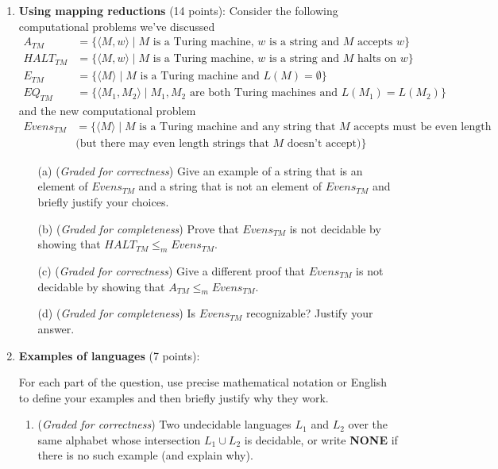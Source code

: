 \documentclass[12pt, oneside]{article}
\newcommand{\gradeCorrect}{({\it Graded for correctness}) }
\newcommand{\gradeComplete}{({\it Graded for completeness}) }
\begin{document}
\begin{enumerate}[wide, labelwidth=!, labelindent=0pt]
\item\textbf{Using mapping reductions} (14 points):
Consider the following computational problems we've discussed
\begin{align*}
A_{TM} &= \{ \langle M, w \rangle \mid M \text{ is a Turing machine, } w \text{ is a string and $M$ accepts $w$}\} \\
HALT_{TM} &= \{ \langle M, w \rangle \mid M \text{ is a Turing machine, } w \text{ is a string and $M$ halts on $w$}\} \\
E_{TM} &=  \{ \langle M \rangle \mid M \text{ is a Turing machine and } L(M) = \emptyset\} \\
EQ_{TM} &= \{ \langle M_1, M_2 \rangle \mid M_1, M_2 \text{ are both Turing machines and } L(M_1) = L(M_2) \}
\end{align*}
and the new computational problem
\begin{align*}
    Evens_{TM} &= \{ \langle M \rangle \mid M \text{ is a Turing machine 
    and any string that $M$ accepts must be even length}\\
    &\text{(but there may even length strings that $M$ doesn't accept)} \}
\end{align*}
\begin{enumerate}
\item[(a)] \gradeCorrect Give an example of a string that is an element of $Evens_{TM}$ and a string that is not an element of
$Evens_{TM}$ and briefly justify your choices.
\item[(b)] \gradeComplete Prove that $Evens_{TM}$ is not decidable by showing that $HALT_{TM} \leq_m Evens_{TM}$.
\item[(c)] \gradeCorrect Give a different proof that $Evens_{TM}$ is not decidable by showing that $A_{TM} \leq_m Evens_{TM}$.
\item[(d)] \gradeComplete Is $Evens_{TM}$ recognizable? Justify your answer.
\end{enumerate}


\item \textbf{Examples of languages} (7 points):

For each part of the question, use precise mathematical notation or English to define your examples
and then briefly justify why they work.

\begin{enumerate}
    \item\gradeCorrect Two undecidable languages $L_1$ and $L_2$ over the same alphabet
        whose intersection $L_1 \cup L_2$ is decidable, or write {\bf NONE}
        if there is no such example (and explain why).
    

\end{enumerate}
\end{enumerate}
\end{document}
